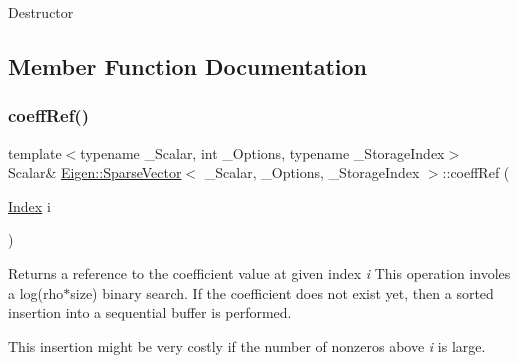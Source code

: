 Destructor 

\subsection{Member Function Documentation}
\mbox{\label{class_eigen_1_1_sparse_vector_a4b1845ada6ae59dd7afe361e30136ace}} 
\subsubsection{\texorpdfstring{coeffRef()}{coeffRef()}}
{\footnotesize\ttfamily template$<$typename \+\_\+\+Scalar, int \+\_\+\+Options, typename \+\_\+\+Storage\+Index$>$ \\
Scalar\& \mbox{\hyperlink{class_eigen_1_1_sparse_vector}{Eigen\+::\+Sparse\+Vector}}$<$ \+\_\+\+Scalar, \+\_\+\+Options, \+\_\+\+Storage\+Index $>$\+::coeff\+Ref (\begin{DoxyParamCaption}\item[{\mbox{\hyperlink{struct_eigen_1_1_eigen_base_a554f30542cc2316add4b1ea0a492ff02}{Index}}}]{i }\end{DoxyParamCaption})\hspace{0.3cm}{\ttfamily [inline]}}

\begin{DoxyReturn}{Returns}
a reference to the coefficient value at given index {\itshape i} This operation involes a log(rho$\ast$size) binary search. If the coefficient does not exist yet, then a sorted insertion into a sequential buffer is performed.
\end{DoxyReturn}
This insertion might be very costly if the number of nonzeros above {\itshape i} is large. \mbox{\label{class_eigen_1_1_sparse_vector_ab8dbb1f73b6250c10c0860eb13ca5cca}} 
